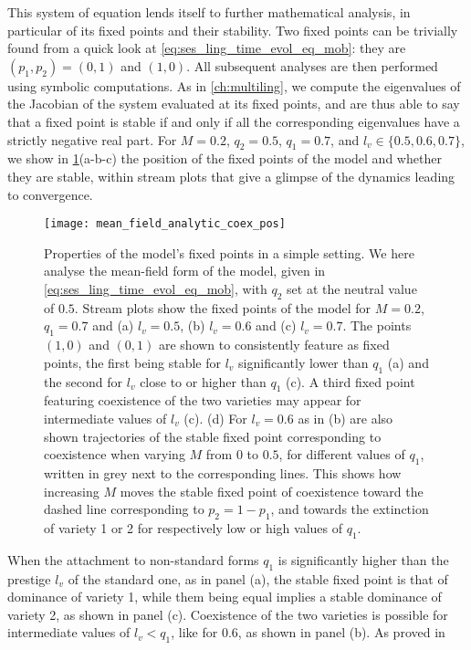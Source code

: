 \documentclass[../thesis.tex]{subfiles}
\begin{document}
This system of equation lends itself to further mathematical analysis, in particular of its
fixed points and their stability. Two fixed points can be trivially found from a quick
look at \cref{eq:ses_ling_time_evol_eq_mob}: they are $(p_1, p_2) = (0, 1)$ and $(1,
0)$.
All subsequent analyses are then performed using symbolic
computations.
As in \cref{ch:multiling}, we compute the eigenvalues of the Jacobian of the system
evaluated at its fixed points, and are thus able to say that a fixed point is stable if
and only if all the corresponding eigenvalues have a strictly negative real part. For $M
= 0.2$, $q_2= 0.5$, $q_1 = 0.7$, and $l_v \in \{ 0.5, 0.6, 0.7\}$, we show in
\cref{fig:mean_field_analytic_coex_pos}(a-b-c) the position of the fixed points of the
model and whether they are stable, within stream plots that give a glimpse of the
dynamics leading to convergence.
\begin{figure}
\centering
  \texttt{[image: mean\_field\_analytic\_coex\_pos]}
  \caption{Properties of the model's fixed points in a simple setting. We here analyse
  the mean-field form of the model, given in \cref{eq:ses_ling_time_evol_eq_mob}, with
  $q_2$ set at the neutral value of $0.5$. Stream plots show the fixed points of the
  model for $M = 0.2$, $q_1 = 0.7$ and (a) $l_v = 0.5$, (b) $l_v = 0.6$ and (c) $l_v =
  0.7$. The points $(1, 0)$ and $(0, 1)$ are shown to consistently feature as fixed
  points, the first being stable for $l_v$ significantly lower than $q_1$ (a) and the
  second for $l_v$ close to or higher than $q_1$ (c). A third fixed point featuring
  coexistence of the two varieties may appear for intermediate values of $l_v$ (c). (d)
  For $l_v = 0.6$ as in (b) are also shown trajectories of the stable fixed point
  corresponding to coexistence when varying $M$ from $0$ to $0.5$, for different values
  of $q_1$, written in grey next to the corresponding lines. This shows how increasing
  $M$ moves the stable fixed point of coexistence toward the dashed line corresponding
  to $p_2 = 1 - p_1$, and towards the extinction of variety 1 or 2 for respectively low
  or high values of $q_1$.}
  \label{fig:mean_field_analytic_coex_pos}
\end{figure}
When the attachment to non-standard forms $q_1$ is significantly higher than the
prestige $l_v$ of the standard one, as in panel (a), the stable fixed point is that of
dominance of variety 1, while them being equal implies a stable dominance of variety 2,
as shown in panel (c). Coexistence of the two varieties is possible for intermediate
values of $l_v < q_1$, like for $0.6$, as shown in panel (b). As proved in
\end{document}
